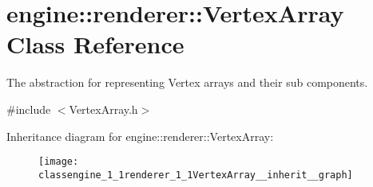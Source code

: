 \hypertarget{classengine_1_1renderer_1_1VertexArray}{}\section{engine\+:\+:renderer\+:\+:Vertex\+Array Class Reference}
\label{classengine_1_1renderer_1_1VertexArray}


The abstraction for representing Vertex arrays and their sub components.  




{\ttfamily \#include $<$Vertex\+Array.\+h$>$}



Inheritance diagram for engine\+:\+:renderer\+:\+:Vertex\+Array\+:\nopagebreak
\begin{figure}[H]
\begin{center}
\leavevmode
\texttt{[image: classengine\_1\_1renderer\_1\_1VertexArray\_\_inherit\_\_graph]}
\end{center}
\end{figure}
